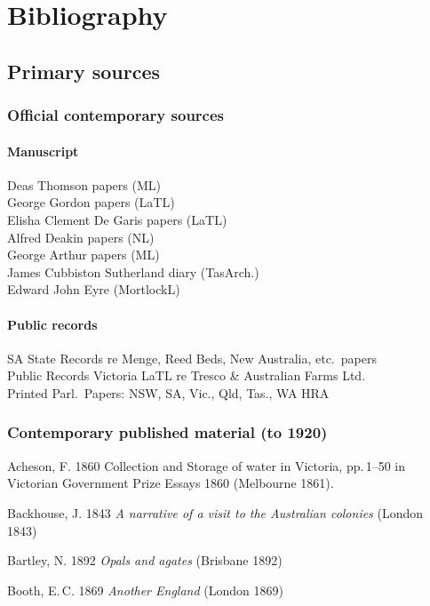 
\chapter{Bibliography}


\section*{Primary sources}

\subsection*{Official contemporary sources}

\subsubsection*{Manuscript}
Deas Thomson papers (ML)\\
George Gordon papers (LaTL)\\
Elisha Clement De Garis papers (LaTL)\\
Alfred Deakin papers (NL)\\
George Arthur papers (ML)\\
James Cubbiston Sutherland diary (TasArch.)\\
Edward John Eyre (MortlockL)

\subsubsection*{Public records}
SA State Records re Menge, Reed Beds, New Australia, etc.\ papers\\
Public Records Victoria LaTL re Tresco \& Australian Farms Ltd.\\
Printed Parl.\ Papers: NSW, SA, Vic., Qld, Tas., WA HRA\\

\subsection*{Contemporary published material (to 1920)}
Acheson, F. 1860 Collection and Storage of water in Victoria,
pp.\,1--50 in Victorian Government Prize Essays 1860 (Melbourne 1861).

Backhouse, J. 1843 \textsl{A narrative of a visit to the Australian
colonies} (London 1843)

Bartley, N. 1892 \textsl{Opals and agates} (Brisbane 1892)

Booth, E.\,C. 1869 \textsl{Another England} (London 1869)


